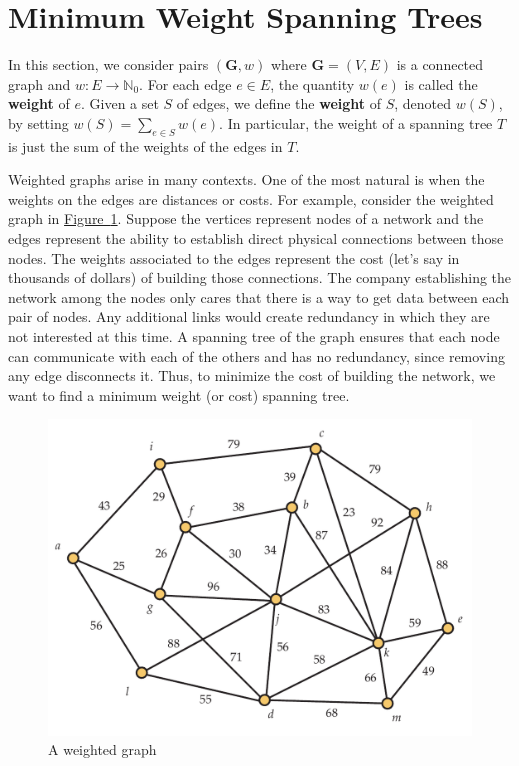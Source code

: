 \documentclass[10pt,]{book}
\newcommand{\terminology}[1]{\textbf{#1}}
\theoremstyle{plain}
\theoremstyle{definition}
\theoremstyle{definition}
\theoremstyle{definition}
\theoremstyle{definition}
\numberwithin{equation}{section}
\newcommand{\nonnegints}{\mathbb{N}_0}
\newcommand{\GVE}{\mathbf{G}=(V,E)}
\newcommand{\bfG}{\mathbf{G}}
\begin{document}
\section[{Minimum Weight Spanning Trees}]{Minimum Weight Spanning Trees}\label{s_graphalgorithms_min-wt-span}
\hypertarget{p-151}{}%
In this section, we consider pairs \((\bfG,w)\) where \(\GVE\) is a connected graph and \(w\colon E\rightarrow\nonnegints\). For each edge \(e\in E\), the quantity \(w(e)\) is called the \terminology{weight} of \(e\). Given a set \(S\) of edges, we define the \terminology{weight} of \(S\), denoted \(w(S)\), by setting \(w(S)=\sum_{e\in S} w(e)\). In particular, the weight of a spanning tree \(T\) is just the sum of the weights of the edges in \(T\).%
\par
\hypertarget{p-152}{}%
Weighted graphs arise in many contexts. One of the most natural is when the weights on the edges are distances or costs. For example, consider the weighted graph in \hyperref[fig_graphalgorithms_spantreegraph]{Figure~\ref{fig_graphalgorithms_spantreegraph}}. Suppose the vertices represent nodes of a network and the edges represent the ability to establish direct physical connections between those nodes. The weights associated to the edges represent the cost (let's say in thousands of dollars) of building those connections. The company establishing the network among the nodes only cares that there is a way to get data between each pair of nodes. Any additional links would create redundancy in which they are not interested at this time. A spanning tree of the graph ensures that each node can communicate with each of the others and has no redundancy, since removing any edge disconnects it. Thus, to minimize the cost of building the network, we want to find a minimum weight (or cost) spanning tree.%
\begin{figure}
\centering
\includegraphics[width=0.9\linewidth]{images/spantreegraph}
\caption{A weighted graph\label{fig_graphalgorithms_spantreegraph}}
\end{figure}
\end{document}
